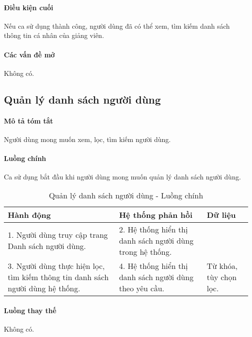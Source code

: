 \documentclass[./../main.tex]{subfiles}
\begin{document}
\paragraph*{Điều kiện cuối}

Nếu ca sử dụng thành công, người dùng đã có thể xem, tìm kiếm danh sách thông tin cá nhân của giảng viên.

\paragraph*{Các vấn đề mở}

Không có.

\subsection{Quản lý danh sách người dùng}

\paragraph*{Mô tả tóm tắt}

Người dùng mong muốn xem, lọc, tìm kiếm người dùng.

\paragraph*{Luồng chính} Ca sử dụng bắt đầu khi người dùng mong muốn quản lý danh sách người dùng.

\begin{table}[H]
	\caption{Quản lý danh sách người dùng - Luồng chính}
	\label{tab:orgAdmin_manage_users}
	\begin{tabularx}{\textwidth}{|X|X|X|}
		\hline
		\textbf{Hành động}                                                             & \textbf{Hệ thống phản hồi}                                & \textbf{Dữ liệu}       \\ \hline
		1. Người dùng truy cập trang Danh sách người dùng.                             & 2. Hệ thống hiển thị danh sách người dùng trong hệ thống. &                        \\ \hline
		3. Người dùng thực hiện lọc, tìm kiếm thông tin danh sách người dùng hệ thống. & 4. Hệ thống hiển thị danh sách người dùng theo yêu cầu.   & Từ khóa, tùy chọn lọc. \\ \hline
	\end{tabularx}
\end{table}

\paragraph*{Luồng thay thế} Không có.
\end{document}
